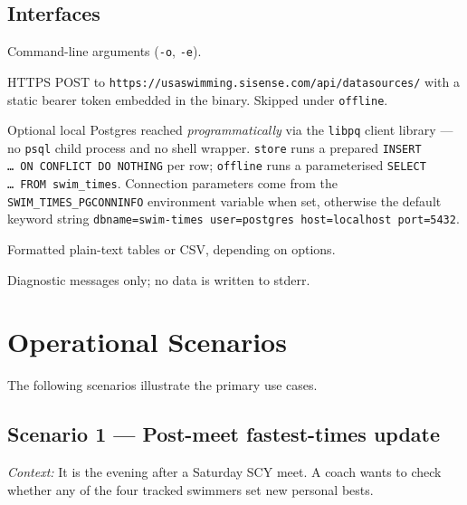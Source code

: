 \documentclass[12pt]{article}
\newcommand{\code}[1]{\texttt{#1}}
\begin{document}
\subsection{Interfaces}

\begin{description}[style=nextline]
  \item[Input.]
        Command-line arguments (\code{-o}, \code{-e}).

  \item[Network.]
        HTTPS POST to
        \texttt{https://usaswimming.sisense.com/api/datasources/}
        with a static bearer token embedded in the binary.
        Skipped under \code{offline}.

  \item[Database.]
        Optional local Postgres reached \emph{programmatically}
        via the \texttt{libpq} client library --- no
        \texttt{psql} child process and no shell wrapper.
        \code{store} runs a prepared
        \texttt{INSERT \dots\ ON~CONFLICT~DO~NOTHING} per row;
        \code{offline} runs a parameterised
        \texttt{SELECT \dots\ FROM swim\_times}.  Connection
        parameters come from the
        \texttt{SWIM\_TIMES\_PGCONNINFO} environment variable
        when set, otherwise the default keyword string
        \texttt{dbname=swim-times user=postgres host=localhost
        port=5432}.

  \item[Standard output.]
        Formatted plain-text tables or CSV, depending on options.

  \item[Standard error.]
        Diagnostic messages only; no data is written to stderr.
\end{description}

\section{Operational Scenarios}

The following scenarios illustrate the primary use cases.

\subsection{Scenario 1 --- Post-meet fastest-times update}

\textit{Context:} It is the evening after a Saturday SCY meet.
A coach wants to check whether any of the four tracked swimmers
set new personal bests.
\end{document}
